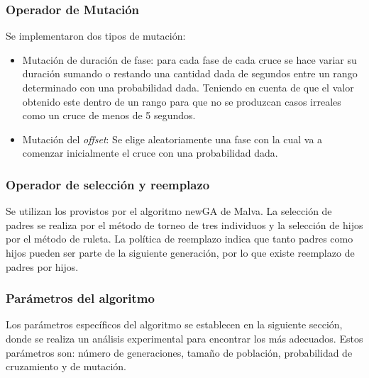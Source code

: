 \subsubsection{Operador de Mutación}
Se implementaron dos tipos de mutación:
\begin{itemize}

\item Mutación de duración de fase: para cada fase de cada cruce se hace variar su duración sumando o restando una cantidad dada de segundos entre un rango determinado con una probabilidad dada. Teniendo en cuenta de que el valor obtenido este dentro de un rango para que no se produzcan casos irreales como un cruce de menos de 5 segundos.

\item Mutación del \emph{offset}: Se elige aleatoriamente una fase con la cual va a comenzar inicialmente el cruce con una probabilidad dada.
\end{itemize}





\subsubsection{Operador de selección y reemplazo}
Se  utilizan los provistos por el algoritmo newGA de Malva. La selección de padres se realiza por el método de torneo de tres individuos y la selección de hijos por el método de ruleta. La política de reemplazo indica que tanto padres como hijos pueden ser parte de la siguiente generación, por lo que existe reemplazo de padres por hijos.

\subsubsection{Parámetros del algoritmo}
Los parámetros específicos del algoritmo se establecen en la siguiente sección, donde se realiza un análisis experimental para encontrar los más adecuados. Estos parámetros son: número de generaciones, tamaño de población, probabilidad de cruzamiento y de mutación.